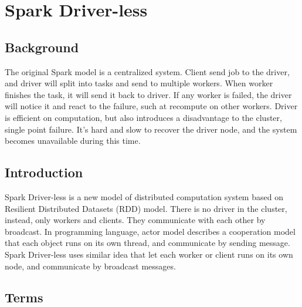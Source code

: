 
\section{Spark Driver-less} %
\label{sec:spark_driver_less}


\subsection{Background} %
\label{sub:background_driver_less}

The original Spark model is a centralized system.
Client send job to the driver, and driver will split into tasks and send to multiple workers.
When worker finishes the task, it will send it back to driver.
If any worker is failed, the driver will notice it and react to the failure, such at recompute on other workers.
Driver is efficient on computation, but also introduces a disadvantage to the cluster, single point failure.
It's hard and slow to recover the driver node, and the system becomes unavailable during this time.



\subsection{Introduction} %
\label{sub:introduction_driver_less}

Spark Driver-less is a new model of distributed computation system based on Resilient Distributed Datasets (RDD)\cite{rdd} model.
There is no driver in the cluster, instead, only workers and clients.
They communicate with each other by broadcast.
In programming language, actor model describes a cooperation model that each object runs on its own thread,
and communicate by sending message.
Spark Driver-less uses similar idea that let each worker or client runs on its own node,
and communicate by broadcast messages.



\subsection{Terms} %
\label{sub:terms_driver_less}


